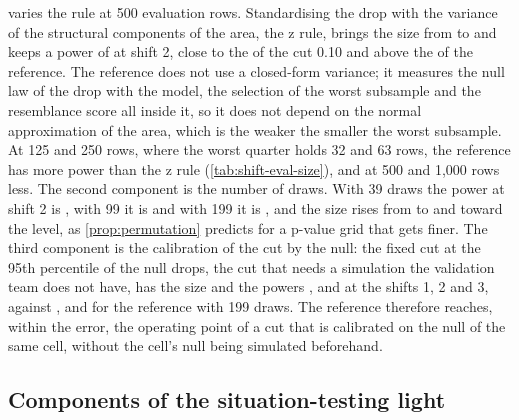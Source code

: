  varies the rule at 500 evaluation rows. Standardising the drop with the variance of the structural components of the area, the z rule, brings the size from \ShRateFixedFiveCZ{} to \ShRateZruleCZ{} and keeps a power of \ShRateZruleCT{} at shift 2, close to the \ShRateFixedTenCT{} of the cut 0.10 and above the \ShRatePermCT{} of the reference. The reference does not use a closed-form variance; it measures the null law of the drop with the model, the selection of the worst subsample and the resemblance score all inside it, so it does not depend on the normal approximation of the area, which is the weaker the smaller the worst subsample. At 125 and 250 rows, where the worst quarter holds 32 and 63 rows, the reference has more power than the z rule (\cref{tab:shift-eval-size}), and at 500 and 1,000 rows less. The second component is the number of draws. With 39 draws the power at shift 2 is \ShRatePermThirtyNineCT{}, with 99 it is \ShRatePermNinetyNineCT{} and with 199 it is \ShRatePermCT{}, and the size rises from \ShRatePermThirtyNineCZ{} to \ShRatePermNinetyNineCZ{} and \ShRatePermCZ{} toward the level, as \cref{prop:permutation} predicts for a p-value grid that gets finer. The third component is the calibration of the cut by the null: the fixed cut at the 95th percentile of the null drops, the cut that needs a simulation the validation team does not have, has the size \ShOracleRateZ{} and the powers \ShOracleRateO{}, \ShOracleRateT{} and \ShOracleRateH{} at the shifts 1, 2 and 3, against \ShRatePermCO{}, \ShRatePermCT{} and \ShRatePermCH{} for the reference with 199 draws. The reference therefore reaches, within the error, the operating point of a cut that is calibrated on the null of the same cell, without the cell's null being simulated beforehand.

\subsection{Components of the situation-testing light}



